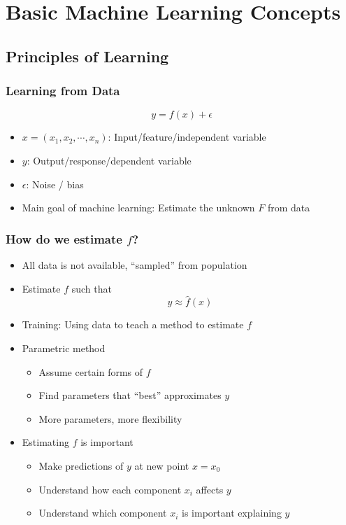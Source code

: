 \section{Basic Machine Learning Concepts}

\subsection{Principles of Learning}

\subsubsection*{Learning from Data}
\begin{equation}
    y=f(x)+\epsilon
\end{equation}
\begin{itemize}
    \item $x=(x_1,x_2,\cdots,x_n)$: Input/feature/independent variable
    \item $y$: Output/response/dependent variable
    \item $\epsilon$: Noise / bias
    \item Main goal of machine learning: Estimate the unknown $F$ from data
\end{itemize}
\begin{figures}
\end{figures}

\subsubsection*{How do we estimate $f$?}
\begin{itemize}
    \item All data is not available, ``sampled'' from population
    \item Estimate $f$ such that
    \begin{equation}
        y\approx\hat{f}(x)
    \end{equation}
    \item Training: Using data to teach a method to estimate $f$
    \item Parametric method
    \begin{itemize}
        \item Assume certain forms of $f$
        \item Find parameters that ``best'' approximates $y$
        \item More parameters, more flexibility
    \end{itemize}
    \item Estimating $f$ is important
    \begin{itemize}
        \item Make predictions of $y$ at new point $x=x_0$
        \item Understand how each component $x_i$ affects $y$
        \item Understand which component $x_i$ is important explaining $y$
    \end{itemize}
\end{itemize}

